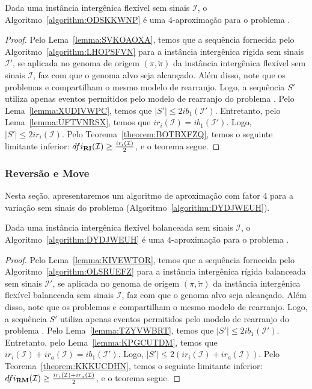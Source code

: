 \begin{theorem}\label{theorem:LXPAWAPW}
Dada uma instância intergênica flexível sem sinais $\mathcal{I}$, o Algoritmo~\ref{algorithm:ODSKKWNP} é uma $4$-aproximação para o problema \SbFIRI{}.
\end{theorem}
\begin{proof}
Pelo Lema~\ref{lemma:SVKOAOXA}, temos que a sequência fornecida pelo Algoritmo~\ref{algorithm:LHOPSFVN} para a instância intergênica rígida sem sinais $\mathcal{I'}$, se aplicada no genoma de origem $(\pi,\breve\pi)$ da instância intergênica flexível sem sinais $\mathcal{I}$, faz com que o genoma alvo seja alcançado. Além disso, note que os problemas \SbIRI{} e \SbFIRI{} compartilham o mesmo modelo de rearranjo. Logo, a sequência $S'$ utiliza apenas eventos permitidos pelo modelo de rearranjo do problema \SbFIRI{}. Pelo Lema~\ref{lemma:XUDIVWPC}, temos que $|S'| \le 2ib_1(\mathcal{I'})$. Entretanto, pelo Lema~\ref{lemma:UFTVNRSX}, temos que $ir_i(\mathcal{I}) = ib_1(\mathcal{I'})$. Logo, $|S'| \le 2ir_i(\mathcal{I})$. Pelo Teorema~\ref{theorem:BOTBXFZQ}, temos o seguinte limitante inferior: $dfi_{\textbf{RI}}(\mathcal{I}) \ge \frac{ir_i(\mathcal{I})}{2}$, e o teorema segue.
\end{proof}

\subsubsection{Reversão e Move}

Nesta seção, apresentaremos um algoritmo de aproximação com fator $4$ para a variação sem sinais do problema \SbFIRM{} (Algoritmo~\ref{algorithm:DYDJWEUH}).



\begin{theorem}\label{theorem:MALFMHVQ}
Dada uma instância intergênica flexível balanceada sem sinais $\mathcal{I}$, o Algoritmo~\ref{algorithm:DYDJWEUH} é uma $4$-aproximação para o problema \SbFIRM{}.
\end{theorem}
\begin{proof}
Pelo Lema~\ref{lemma:KIVEWTOR}, temos que a sequência fornecida pelo Algoritmo~\ref{algorithm:OLSRUEFZ} para a instância intergênica rígida balanceada sem sinais $\mathcal{I'}$, se aplicada no genoma de origem $(\pi,\breve\pi)$ da instância intergênica flexível balanceada sem sinais $\mathcal{I}$, faz com que o genoma alvo seja alcançado. Além disso, note que os problemas \SbIRM{} e \SbFIRM{} compartilham o mesmo modelo de rearranjo. Logo, a sequência $S'$ utiliza apenas eventos permitidos pelo modelo de rearranjo do problema \SbFIRM{}. Pelo Lema~\ref{lemma:TZYVWBRT}, temos que $|S'| \le 2ib_1(\mathcal{I'})$. Entretanto, pelo Lema~\ref{lemma:KPGCUTDM}, temos que $ir_i(\mathcal{I}) + ir_a(\mathcal{I}) = ib_1(\mathcal{I'})$. Logo, $|S'| \le 2(ir_i(\mathcal{I}) + ir_a(\mathcal{I}))$. Pelo Teorema~\ref{theorem:KKKUCDHN}, temos o seguinte limitante inferior: $dfi_{\textbf{RM}}(\mathcal{I}) \ge \frac{ir_i(\mathcal{I}) + ir_a(\mathcal{I})}{2}$, e o teorema segue.
\end{proof}

